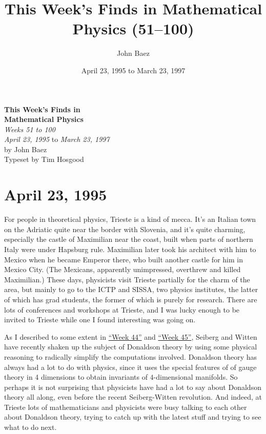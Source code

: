 \documentclass{article}
\title{This Week's Finds in Mathematical Physics (51--100)}
\author{John Baez}
\date{April 23, 1995 to March 23, 1997}
\begin{document}
\begin{titlepage}
  \begin{center}
    {\Huge\textbf{This Week's Finds in}}
  \\[0.7em]{\Huge\textbf{Mathematical Physics}}
  \\[1em]{\huge\textit{Weeks 51 to 100}}
  \\[4em]{\LARGE \textit{April 23, 1995} to \textit{March 23, 1997}}
  \\[4em]{\huge by John Baez}
  \\[0.5em]{\Large{Typeset by Tim Hosgood}}
  \end{center}
\end{titlepage}

\tableofcontents

\hypertarget{week51}{%
\section{April 23, 1995}\label{week51}}

For people in theoretical physics, Trieste is a kind of mecca. It's an
Italian town on the Adriatic quite near the border with Slovenia, and
it's quite charming, especially the castle of Maximilian near the coast,
built when parts of northern Italy were under Hapsburg rule. Maximilian
later took his architect with him to Mexico when he became Emperor
there, who built another castle for him in Mexico City. (The Mexicans,
apparently unimpressed, overthrew and killed Maximilian.) These days,
physicists visit Trieste partially for the charm of the area, but mainly
to go to the ICTP and SISSA, two physics institutes, the latter of which
has grad students, the former of which is purely for research. There are
lots of conferences and workshops at Trieste, and I was lucky enough to
be invited to Trieste while one I found interesting was going on.

As I described to some extent in \protect\hyperlink{week44}{``Week 44''}
and \protect\hyperlink{week45}{``Week 45''}, Seiberg and Witten have
recently shaken up the subject of Donaldson theory by using some
physical reasoning to radically simplify the computations involved.
Donaldson theory has always had a lot to do with physics, since it uses
the special features of of gauge theory in 4 dimensions to obtain
invariants of \(4\)-dimensional manifolds. So perhaps it is not
surprising that physicists have had a lot to say about Donaldson theory
all along, even before the recent Seiberg-Witten revolution. And indeed,
at Trieste lots of mathematicians and physicists were busy talking to
each other about Donaldson theory, trying to catch up with the latest
stuff and trying to see what to do next.
\end{document}
